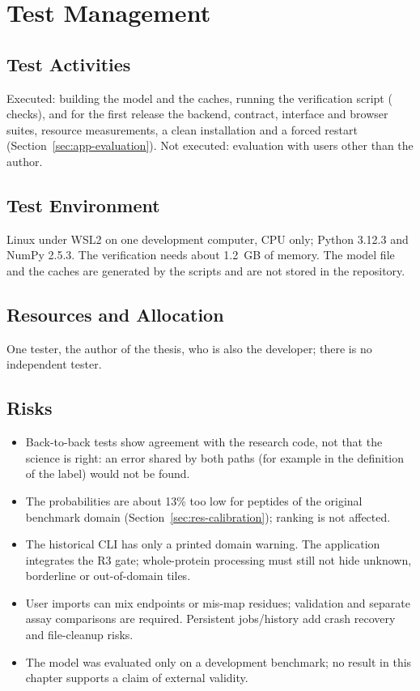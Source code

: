 \section{Test Management}
\subsection{Test Activities}
Executed: building the model and the caches, running the verification script (\nVerNChecks{}
checks), and for the first release the backend, contract, interface and browser suites, resource
measurements, a clean installation and a forced restart (Section~\ref{sec:app-evaluation}). Not
executed: evaluation with users other than the author.
\subsection{Test Environment}
Linux under WSL2 on one development computer, CPU only; Python 3.12.3 and NumPy 2.5.3. The verification needs about 1.2~GB of memory. The model file and the caches are generated by
the scripts and are not stored in the repository.
\subsection{Resources and Allocation}
One tester, the author of the thesis, who is also the developer; there is no independent tester.
\subsection{Risks}
\begin{itemize}
  \item Back-to-back tests show agreement with the research code, not that the science is right: an error shared by both paths (for example in the definition of the label) would not be found.
  \item The probabilities are about 13\% too low for peptides of the original benchmark domain (Section~\ref{sec:res-calibration}); ranking is not affected.
  \item The historical CLI has only a printed domain warning. The application integrates the R3 gate;
        whole-protein processing must still not hide unknown, borderline or out-of-domain tiles.
  \item User imports can mix endpoints or mis-map residues; validation and separate assay comparisons
        are required. Persistent jobs/history add crash recovery and file-cleanup risks.
  \item The model was evaluated only on a development benchmark; no result in this chapter supports a claim of external validity.
\end{itemize}


